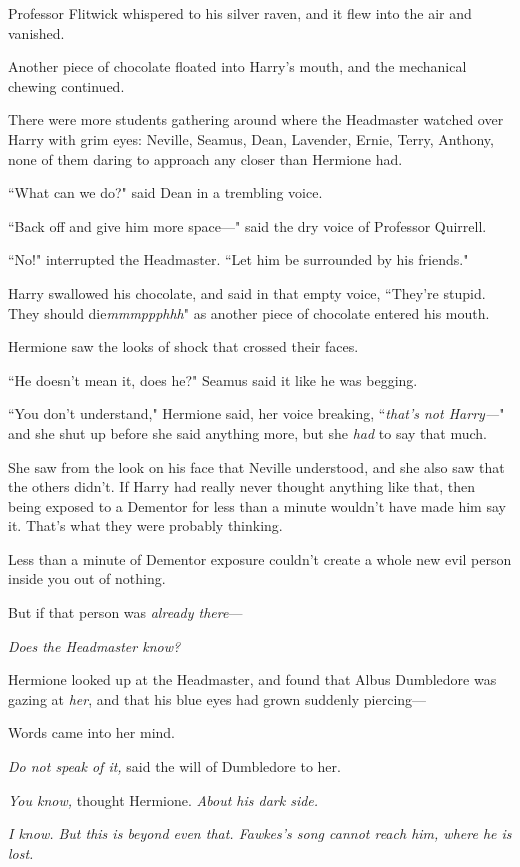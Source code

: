 Professor Flitwick whispered to his silver raven, and it flew into the air and vanished.

Another piece of chocolate floated into Harry's mouth, and the mechanical chewing continued.

There were more students gathering around where the Headmaster watched over Harry with grim eyes: Neville, Seamus, Dean, Lavender, Ernie, Terry, Anthony, none of them daring to approach any closer than Hermione had.

``What can we do?" said Dean in a trembling voice.

``Back off and give him more space—" said the dry voice of Professor Quirrell.

``No!" interrupted the Headmaster. ``Let him be surrounded by his friends."

Harry swallowed his chocolate, and said in that empty voice, ``They're stupid. They should die\emph{mmmppphhh}" as another piece of chocolate entered his mouth.

Hermione saw the looks of shock that crossed their faces.

``He doesn't mean it, does he?" Seamus said it like he was begging.

``You don't understand," Hermione said, her voice breaking, ``\emph{that's not Harry—}" and she shut up before she said anything more, but she \emph{had} to say that much.

She saw from the look on his face that Neville understood, and she also saw that the others didn't. If Harry had really never thought anything like that, then being exposed to a Dementor for less than a minute wouldn't have made him say it. That's what they were probably thinking.

Less than a minute of Dementor exposure couldn't create a whole new evil person inside you out of nothing.

But if that person was \emph{already there}—

\emph{Does the Headmaster know?}

Hermione looked up at the Headmaster, and found that Albus Dumbledore was gazing at \emph{her}, and that his blue eyes had grown suddenly piercing—

Words came into her mind.

\emph{Do not speak of it,} said the will of Dumbledore to her.

\emph{You know,} thought Hermione. \emph{About his dark side.}

\emph{I know. But this is beyond even that. Fawkes's song cannot reach him, where he is lost.}

